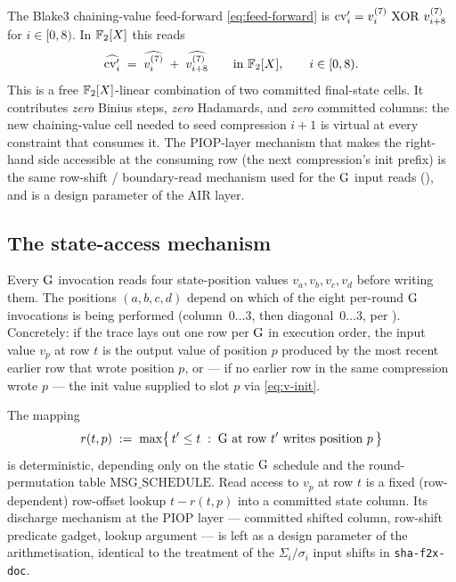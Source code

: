 The Blake3 chaining-value feed-forward \eqref{eq:feed-forward} is
$\mathrm{cv}'_i = v^{(7)}_i \,\operatorname{XOR}\, v^{(7)}_{i+8}$ for $i \in [0, 8)$.
In $\mathbb{F}_2[X]$ this reads
\begin{equation}\label{eq:b3-ff-f2x}
\widehat{\mathrm{cv}'_i} \;=\; \widehat{v^{(7)}_i} \;+\; \widehat{v^{(7)}_{i+8}}
\qquad \text{in } \mathbb{F}_2[X], \qquad i \in [0, 8).
\end{equation}
This is a free $\mathbb{F}_2[X]$-linear combination of two committed
final-state cells. It contributes \emph{zero} Binius steps, \emph{zero}
Hadamards, and \emph{zero} committed columns: the new chaining-value
cell needed to seed compression $i+1$ is virtual at every constraint
that consumes it. The PIOP-layer mechanism that makes the right-hand
side accessible at the consuming row (the next compression's init
prefix) is the same row-shift / boundary-read mechanism used for the
$\operatorname{G}$ input reads (), and is a design
parameter of the AIR layer.

\subsection{The state-access mechanism}\label{sec:b3-state-access}

Every $\operatorname{G}$ invocation reads four state-position values
$v_a, v_b, v_c, v_d$ before writing them. The positions $(a, b, c, d)$
depend on which of the eight per-round $\operatorname{G}$ invocations is being
performed (column~$0\ldots3$, then diagonal~$0\ldots3$, per
). Concretely: if the trace lays out one row per
$\operatorname{G}$ in execution order, the input value $v_p$ at row $t$ is the
output value of position $p$ produced by the most recent earlier row
that wrote position $p$, or — if no earlier row in the same
compression wrote $p$ — the init value supplied to slot $p$ via
\eqref{eq:v-init}.

The mapping
\begin{equation}\label{eq:b3-row-of-last-write}
r(t, p) \;:=\; \max\bigl\{\, t' \le t \;:\; \text{$\operatorname{G}$ at row $t'$ writes position $p$} \,\bigr\}
\end{equation}
is deterministic, depending only on the static $\operatorname{G}$ schedule and
the round-permutation table $\mathrm{MSG\_SCHEDULE}$. Read access to
$v_p$ at row $t$ is a fixed (row-dependent) row-offset lookup
$t - r(t, p)$ into a committed state column. Its discharge mechanism
at the PIOP layer — committed shifted column, row-shift predicate
gadget, lookup argument — is left as a design parameter of the
arithmetisation, identical to the treatment of the $\Sigma_i / \sigma_i$
input shifts in \texttt{sha-f2x-doc}.

